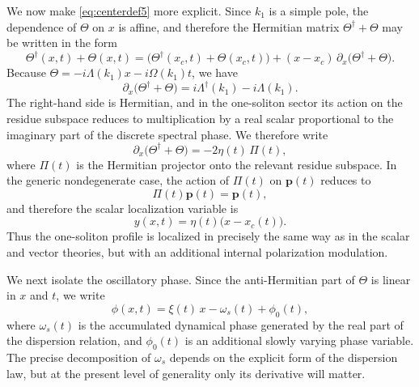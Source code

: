 \documentclass[11pt]{amsart}
\theoremstyle{definition}
\numberwithin{equation}{section}
\begin{document}
We now make \eqref{eq:centerdef5} more explicit. Since $k_1$ is a simple pole, the dependence of $\Theta$ on $x$ is affine, and therefore the Hermitian matrix $\Theta^\dagger+\Theta$ may be written in the form
\begin{equation}
\Theta^\dagger(x,t)+\Theta(x,t)
=
\bigl(\Theta^\dagger(x_c,t)+\Theta(x_c,t)\bigr)
+
(x-x_c)\,\partial_x\bigl(\Theta^\dagger+\Theta\bigr).
\label{eq:ThetaExpandCenter5}
\end{equation}
Because $\Theta=-i\Lambda(k_1)x-i\Omega(k_1)t$, we have
\begin{equation}
\partial_x\bigl(\Theta^\dagger+\Theta\bigr)
=
i\Lambda^\dagger(k_1)-i\Lambda(k_1).
\label{eq:ThetaXDeriv5}
\end{equation}
The right-hand side is Hermitian, and in the one-soliton sector its action on the residue subspace reduces to multiplication by a real scalar proportional to the imaginary part of the discrete spectral phase. We therefore write
\begin{equation}
\partial_x\bigl(\Theta^\dagger+\Theta\bigr)
=
-2\eta(t)\,\Pi(t),
\label{eq:ThetaXProjector5}
\end{equation}
where $\Pi(t)$ is the Hermitian projector onto the relevant residue subspace. In the generic nondegenerate case, the action of $\Pi(t)$ on $\mathbf p(t)$ reduces to
\[
\Pi(t)\mathbf p(t)=\mathbf p(t),
\]
and therefore the scalar localization variable is
\begin{equation}
y(x,t)=\eta(t)\bigl(x-x_c(t)\bigr).
\label{eq:ydef5}
\end{equation}
Thus the one-soliton profile is localized in precisely the same way as in the scalar and vector theories, but with an additional internal polarization modulation.

We next isolate the oscillatory phase. Since the anti-Hermitian part of $\Theta$ is linear in $x$ and $t$, we write
\begin{equation}
\phi(x,t)=\xi(t)\,x-\omega_s(t)+\phi_0(t),
\label{eq:phidef5}
\end{equation}
where $\omega_s(t)$ is the accumulated dynamical phase generated by the real part of the dispersion relation, and $\phi_0(t)$ is an additional slowly varying phase variable. The precise decomposition of $\omega_s$ depends on the explicit form of the dispersion law, but at the present level of generality only its derivative will matter.
\end{document}
